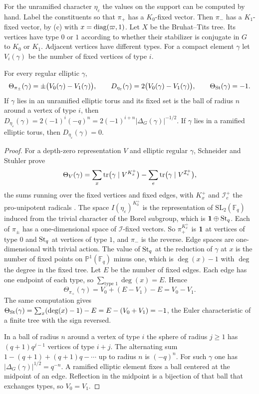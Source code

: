 For the unramified character $\eta_\varepsilon$ the values on the support can be computed by hand. Label the constituents so that $\pi_+$ has a $K_0$-fixed vector. Then $\pi_-$ has a $K_1$-fixed vector, by (c) with $x=\operatorname{diag}(\varpi,1)$. Let $X$ be the Bruhat--Tits tree. Its vertices have type $0$ or $1$ according to whether their stabilizer is conjugate in $G$ to $K_0$ or $K_1$. Adjacent vertices have different types. For a compact element $\gamma$ let $V_i(\gamma)$ be the number of fixed vertices of type $i$.

\begin{theorem}\label{thm:tree}For every regular elliptic $\gamma$,
\[
\Theta_{\pi_\pm}(\gamma)=\pm\bigl(V_0(\gamma)-V_1(\gamma)\bigr),\qquad D_{\eta_\varepsilon}(\gamma)=2\bigl(V_0(\gamma)-V_1(\gamma)\bigr),\qquad \Theta_{\operatorname{St}}(\gamma)=-1 .
\]
If $\gamma$ lies in an unramified elliptic torus and its fixed set is the ball of radius $n$ around a vertex of type $i$, then $D_{\eta_\varepsilon}(\gamma)=2(-1)^i(-q)^n=2(-1)^{i+n}|\Delta_G(\gamma)|^{-1/2}$. If $\gamma$ lies in a ramified elliptic torus, then $D_{\eta_\varepsilon}(\gamma)=0$.
\end{theorem}
\begin{proof}
For a depth-zero representation $V$ and elliptic regular $\gamma$, Schneider and Stuhler prove
\[
\Theta_V(\gamma)=\sum_{x}\operatorname{tr}\bigl(\gamma\mid V^{K_x^+}\bigr)-\sum_{e}\operatorname{tr}\bigl(\gamma\mid V^{\mathcal I_e^+}\bigr),
\]
the sums running over the fixed vertices and fixed edges, with $K_x^+$ and $\mathcal I_e^+$ the pro-unipotent radicals \cite[Section III.4]{SS97}. The space $I(\eta_\varepsilon)^{K_0^+}$ is the representation of $\mathrm{SL}_2(\mathbb F_q)$ induced from the trivial character of the Borel subgroup, which is $\mathbf 1\oplus\operatorname{St}_q$. Each of $\pi_\pm$ has a one-dimensional space of $\mathcal I$-fixed vectors. So $\pi_+^{K_x^+}$ is $\mathbf 1$ at vertices of type $0$ and $\operatorname{St}_q$ at vertices of type $1$, and $\pi_-$ is the reverse. Edge spaces are one-dimensional with trivial action. The value of $\operatorname{St}_q$ at the reduction of $\gamma$ at $x$ is the number of fixed points on $\mathbb P^1(\mathbb F_q)$ minus one, which is $\deg(x)-1$ with $\deg$ the degree in the fixed tree. Let $E$ be the number of fixed edges. Each edge has one endpoint of each type, so $\sum_{\text{type }1}\deg(x)=E$. Hence
\[
\Theta_{\pi_+}(\gamma)=V_0+(E-V_1)-E=V_0-V_1 .
\]
The same computation gives $\Theta_{\operatorname{St}}(\gamma)=\sum_x(\deg(x)-1)-E=E-(V_0+V_1)=-1$, the Euler characteristic of a finite tree with the sign reversed.

In a ball of radius $n$ around a vertex of type $i$ the sphere of radius $j\ge1$ has $(q+1)q^{j-1}$ vertices of type $i+j$. The alternating sum $1-(q+1)+(q+1)q-\cdots$ up to radius $n$ is $(-q)^n$. For such $\gamma$ one has $|\Delta_G(\gamma)|^{1/2}=q^{-n}$. A ramified elliptic element fixes a ball centered at the midpoint of an edge. Reflection in the midpoint is a bijection of that ball that exchanges types, so $V_0=V_1$.
\end{proof}
